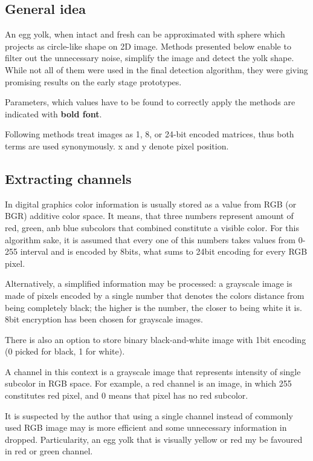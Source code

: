 \documentclass[12pt,twoside,a4paper]{article}
\begin{document}
\subsection{General idea}
An egg yolk, when intact and fresh can be approximated with sphere which projects as circle-like shape on 2D image.
Methods presented below enable to filter out the unnecessary noise, simplify the image and detect the yolk shape.
While not all of them were used in the final detection algorithm, they were giving promising results on the early stage prototypes.

Parameters, which values have to be found to correctly apply the methods are indicated with \textbf{bold font}.

Following methods treat images as 1, 8, or 24-bit encoded matrices, thus both terms are used synonymously.
x and y denote pixel position.
\subsection{Extracting channels}
In digital graphics color information is usually stored as a value from RGB (or BGR) additive color space.
It means, that three numbers represent amount of red, green, anb blue subcolors that combined constitute a visible color.
For this algorithm sake, it is assumed that every one of this numbers takes values from 0-255 interval and is encoded by 8bits, what sums to 24bit encoding for every RGB pixel.

Alternatively, a simplified information may be processed: a grayscale image is made of pixels encoded by a single number that denotes the colors distance from being completely black; the higher is the number, the closer to being white it is.
8bit encryption has been chosen for grayscale images.

There is also an option to store binary black-and-white image with 1bit encoding (0 picked for black, 1 for white).
 
A channel in this context is a grayscale image that represents intensity of single subcolor in RGB space. 
For example, a red channel is an image, in which 255 constitutes red pixel, and 0 means that pixel has no red subcolor.

It is suspected by the author that using a single channel instead of commonly used RGB image may is more efficient and some unnecessary information in dropped.
Particularity, an egg yolk that is visually yellow or red my be favoured in red or green channel.
\end{document}
